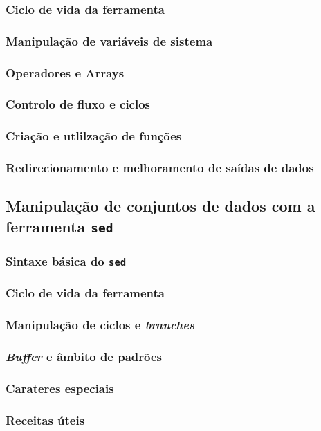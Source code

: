 \documentclass[a4paper, onecolumn, 10pt]{report}
\begin{document}
\subsubsection{Ciclo de vida da ferramenta}

\subsubsection{Manipulação de variáveis de sistema}

\subsubsection{Operadores e Arrays}

\subsubsection{Controlo de fluxo e ciclos}

\subsubsection{Criação e utlilzação de funções}

\subsubsection{Redirecionamento e melhoramento de saídas de dados}

\subsection{Manipulação de conjuntos de dados com a ferramenta \texttt{sed}}

\subsubsection{Sintaxe básica do \texttt{sed}}

\subsubsection{Ciclo de vida da ferramenta}

\subsubsection{Manipulação de ciclos e \textit{branches}}

\subsubsection{\textit{Buffer} e âmbito de padrões}

\subsubsection{Carateres especiais}

\subsubsection{Receitas úteis}


\tableofcontents

\newpage

\printacronyms[include-classes=abbrev, name=Acrónimos]
\end{document}
